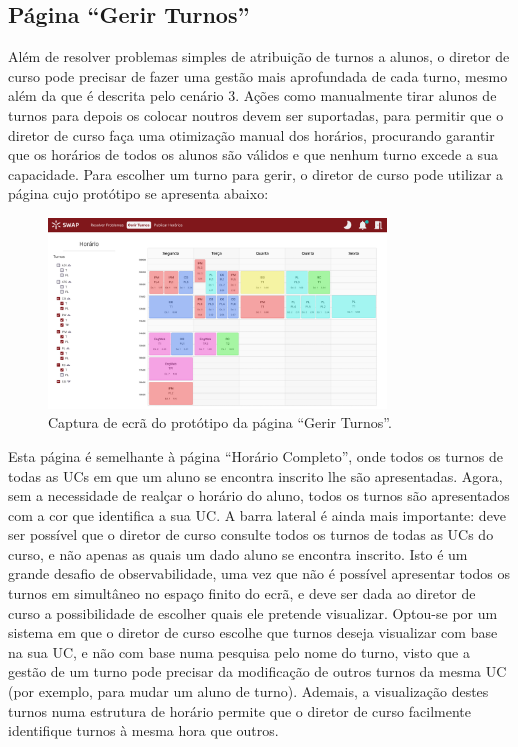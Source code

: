 \documentclass[12pt, a4paper]{article}
\begin{document}
\subsection{Página ``Gerir Turnos''}

Além de resolver problemas simples de atribuição de turnos a alunos, o diretor de curso pode
precisar de fazer uma gestão mais aprofundada de cada turno, mesmo além da que é descrita pelo
cenário 3. Ações como manualmente tirar alunos de turnos para depois os colocar noutros devem ser
suportadas, para permitir que o diretor de curso faça uma otimização manual dos horários, procurando
garantir que os horários de todos os alunos são válidos e que nenhum turno excede a sua capacidade.
Para escolher um turno para gerir, o diretor de curso pode utilizar a página cujo protótipo se
apresenta abaixo:

\begin{figure}[H]
    \centering
    \includegraphics[width=0.8\textwidth]{res/prototype/gerir-turnos.png}
    \caption{Captura de ecrã do protótipo da página ``Gerir Turnos''.}
    \label{gerir-turnos}
\end{figure}

Esta página é semelhante à página ``Horário Completo'', onde todos os turnos de todas as UCs em que
um aluno se encontra inscrito lhe são apresentadas. Agora, sem a necessidade de realçar o horário do
aluno, todos os turnos são apresentados com a cor que identifica a sua UC. A barra lateral é ainda
mais importante: deve ser possível que o diretor de curso consulte todos os turnos de todas as UCs
do curso, e não apenas as quais um dado aluno se encontra inscrito. Isto é um grande desafio de
observabilidade, uma vez que não é possível apresentar todos os turnos em simultâneo no espaço
finito do ecrã, e deve ser dada ao diretor de curso a possibilidade de escolher quais ele pretende
visualizar. Optou-se por um sistema em que o diretor de curso escolhe que turnos deseja visualizar
com base na sua UC, e não com base numa pesquisa pelo nome do turno, visto que a gestão de um turno
pode precisar da modificação de outros turnos da mesma UC (por exemplo, para mudar um aluno de
turno). Ademais, a visualização destes turnos numa estrutura de horário permite que o diretor de
curso facilmente identifique turnos à mesma hora que outros.
\end{document}
